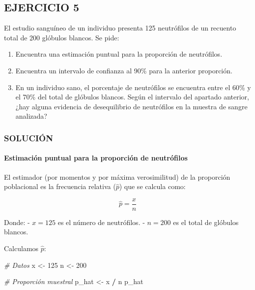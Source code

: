 \documentclass[
]{article}
\newenvironment{Shaded}{\begin{snugshade}}{\end{snugshade}}
\newcommand{\CommentTok}[1]{\textcolor[rgb]{0.56,0.35,0.01}{\textit{#1}}}
\newcommand{\DecValTok}[1]{\textcolor[rgb]{0.00,0.00,0.81}{#1}}
\newcommand{\NormalTok}[1]{#1}
\newcommand{\OtherTok}[1]{\textcolor[rgb]{0.56,0.35,0.01}{#1}}
\newcommand{\SpecialCharTok}[1]{\textcolor[rgb]{0.81,0.36,0.00}{\textbf{#1}}}
\providecommand{\tightlist}{%
  \setlength{\itemsep}{0pt}\setlength{\parskip}{0pt}}
\begin{document}
\subsection{EJERCICIO 5}\label{ejercicio-5-3}

El estudio sanguíneo de un individuo presenta 125 neutrófilos de un recuento total de 200 glóbulos blancos. Se pide:

\begin{enumerate}
\def\labelenumi{\arabic{enumi}.}
\tightlist
\item
  Encuentra una estimación puntual para la proporción de neutrófilos.\\
\item
  Encuentra un intervalo de confianza al 90\% para la anterior proporción.\\
\item
  En un individuo sano, el porcentaje de neutrófilos se encuentra entre el 60\% y el 70\% del total de glóbulos blancos. Según el intervalo del apartado anterior, ¿hay alguna evidencia de desequilibrio de neutrófilos en la muestra de sangre analizada?
\end{enumerate}

\subsubsection{SOLUCIÓN}\label{soluciuxf3n-19}

\paragraph{Estimación puntual para la proporción de neutrófilos}\label{estimaciuxf3n-puntual-para-la-proporciuxf3n-de-neutruxf3filos}

El estimador (por momentos y por máxima verosimilitud) de la proporción poblacional es la frecuencia relativa (\(\hat{p}\)) que se calcula como:

\[ \hat{p} = \frac{x}{n} \]

Donde:
- \(x = 125\) es el número de neutrófilos.
- \(n = 200\) es el total de glóbulos blancos.

Calculamos \(\hat{p}\):

\begin{Shaded}
\begin{Highlighting}[]
\CommentTok{\# Datos}
\NormalTok{x }\OtherTok{\textless{}{-}} \DecValTok{125}
\NormalTok{n }\OtherTok{\textless{}{-}} \DecValTok{200}

\CommentTok{\# Proporción muestral}
\NormalTok{p\_hat }\OtherTok{\textless{}{-}}\NormalTok{ x }\SpecialCharTok{/}\NormalTok{ n}
\NormalTok{p\_hat}
\end{Highlighting}
\end{Shaded}
\end{document}
